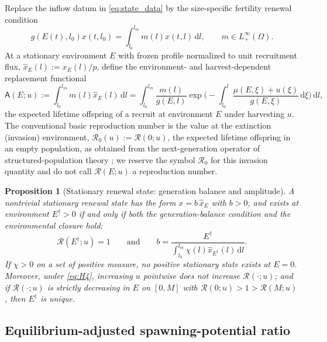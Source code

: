 \documentclass[pdflatex,sn-mathphys-num]{sn-jnl}
\newcommand{\Om}{\Omega}
\newcommand{\dd}{\,\mathrm{d}}
\theoremstyle{plain}
\newtheorem{proposition}[theorem]{Proposition}
\theoremstyle{definition}
\theoremstyle{remark}
\begin{document}
Replace the inflow datum in \eqref{eq:state_data} by the size-specific fertility
renewal condition
\begin{equation}\label{eq:renewal_bc}
g(E(t),l_0)x(t,l_0)=\int_{l_0}^{l_m}m(l)x(t,l)\dd l,
\qquad m\in L^\infty_+(\Om).
\end{equation}
At a stationary environment $E$ with frozen profile normalized to unit recruitment
flux, $\hat x_E(l):=x_E(l)/p$, define the environment- and harvest-dependent
replacement functional
\[
\mathsf A(E;u):=\int_{l_0}^{l_m}m(l)\hat x_E(l)\dd l
=
\int_{l_0}^{l_m}\frac{m(l)}{g(E,l)}\exp\!\Big(-\!\int_{l_0}^l\frac{\mu(E,\xi)+u(\xi)}{g(E,\xi)}\dd\xi\Big)\dd l,
\]
the expected lifetime offspring of a recruit at environment $E$ under harvesting
$u$. The conventional basic reproduction number is the value at the
extinction (invasion) environment,
$\displaystyle \mathcal R_0(u):=\mathcal R(0;u)$,
the expected lifetime offspring in an empty population, as obtained from the
next-generation operator of structured-population theory
\cite{diekmann2003steady,cushing1994structured}; we reserve the symbol $\mathcal R_0$
for this invasion quantity and do not call $\mathcal R(E;u)$ a reproduction number.

\begin{proposition}[Stationary renewal state: generation balance and amplitude]
\label{prop:R0_monotone}
A nontrivial stationary renewal state has the form $x=b\,\hat x_E$ with $b>0$, and
exists at environment $E^{\dagger}>0$ if and only if both the generation-balance
condition and the environmental closure hold:
\begin{equation}\label{eq:renewal_equilibrium}
\mathcal R(E^{\dagger};u)=1
\qquad\text{and}\qquad
b=\frac{E^{\dagger}}{\displaystyle\int_{l_0}^{l_m}\chi(l)\hat x_{E^{\dagger}}(l)\dd l}.
\end{equation}
If $\chi>0$ on a set of positive measure, no positive stationary state exists at
$E=0$. Moreover, under \eqref{eq:H4}, increasing $u$ pointwise does not increase
$\mathcal R(\cdot;u)$; and if $\mathcal R(\cdot;u)$ is strictly decreasing in $E$
on $[0,M]$ with $\mathcal R(0;u)>1>\mathcal R(M;u)$, then $E^{\dagger}$ is unique.
\end{proposition}

\subsection{Equilibrium-adjusted spawning-potential ratio}
\label{subsec:SPR}
\end{document}
